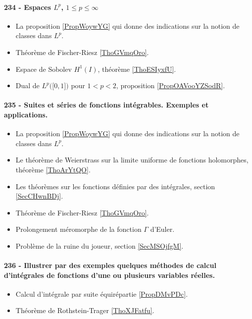 \paragraph{234 - Espaces \( L^p\), \( 1\leq p\leq\infty\)}
\begin{itemize}
    \item La proposition \ref{PropWoywYG} qui donne des indications sur la notion de classes dans \( L^p\).
    \item Théorème de Fischer-Riesz \ref{ThoGVmqOro}.
    \item Espace de Sobolev \( H^1(I)\), théorème \ref{ThoESIyxfU}.
    \item Dual de \( L^p\big( \mathopen[ 0 , 1 \mathclose] \big)\) pour \( 1<p<2\), proposition \ref{PropOAVooYZSodR}.
\end{itemize}
\paragraph{235 - Suites et séries de fonctions intégrables. Exemples et applications.}
\begin{itemize}
    \item La proposition \ref{PropWoywYG} qui donne des indications sur la notion de classes dans \( L^p\).
    \item Le théorème de Weierstrass sur la limite uniforme de fonctions holomorphes, théorème \ref{ThoArYtQO}.
    \item Les théorèmes sur les fonctions définies par des intégrales, section \ref{SecCHwnBDj}.
    \item Théorème de Fischer-Riesz \ref{ThoGVmqOro}.
    \item Prolongement méromorphe de la fonction \( \Gamma\) d'Euler.
    \item Problème de la ruine du joueur, section \ref{SecMSOjfgM}.
\end{itemize}
\paragraph{236 - Illustrer par des exemples quelques méthodes de calcul d'intégrales de fonctions d’une ou plusieurs variables réelles.}
\begin{itemize}
    \item Calcul d'intégrale par suite équirépartie \ref{PropDMvPDc}.
    \item Théorème de Rothstein-Trager \ref{ThoXJFatfu}.
\end{itemize}
